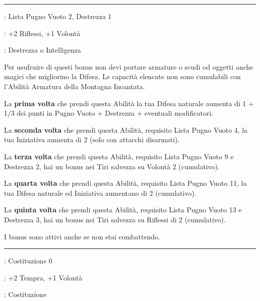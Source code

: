 \begin{multicols}{2}
\smallskip\noindent\rule{\linewidth}{2pt} \hypertarget{Gru d'Argento}{}\medskip{}
\noindent
\begin{description}[noitemsep, topsep=0pt, parsep=0pt, partopsep=0pt, leftmargin=0cm, labelwidth=2.5cm]
    \item[\textbf{Requisito}]: Lista Pugno Vuoto 2, Destrezza 1
    \item[\textbf{Tiri Salvezza}]: +2 Riflessi, +1 Volontà
    \item[\textbf{Caratteristica}]: Destrezza o Intelligenza
\end{description}

Per usufruire di questi bonus non devi portare armature o scudi od oggetti anche magici che migliorino la Difesa. Le capacità elencate non sono cumulabili con l'Abilità Armatura della Montagna Incantata.

La \textbf{prima volta} che prendi questa Abilità la tua Difesa naturale aumenta di 1 + 1/3 dei punti in Pugno Vuoto + Destrezza + eventuali modificatori.

La \textbf{seconda volta} che prendi questa Abilità, requisito Lista Pugno Vuoto 4, la tua Iniziativa aumenta di 2 (solo con attacchi disarmati).

La \textbf{terza volta} che prendi questa Abilità, requisito Lista Pugno Vuoto 9 e Destrezza 2, hai un bonus nei Tiri salvezza su Volontà 2 (cumulativo).

La \textbf{quarta volta} che prendi questa Abilità, requisito Lista Pugno Vuoto 11, la tua Difesa naturale ed Iniziativa aumentano di 2 (cumulativo).

La \textbf{quinta volta} che prendi questa Abilità, requisito Lista Pugno Vuoto 13 e Destrezza 3, hai un bonus nei Tiri salvezza su Riflessi di 2 (cumulativo).

I bonus sono attivi anche se non stai combattendo.

\smallskip\noindent\rule{\linewidth}{2pt} \hypertarget{Guarigione accelerata}{}\medskip{}
\noindent
\begin{description}[noitemsep, topsep=0pt, parsep=0pt, partopsep=0pt, leftmargin=0cm, labelwidth=2.5cm]
    \item[\textbf{Requisito}]: Costituzione 0
    \item[\textbf{Tiri Salvezza}]: +2 Tempra, +1 Volontà
    \item[\textbf{Caratteristica}]: Costituzione
\end{description}


\end{multicols}

